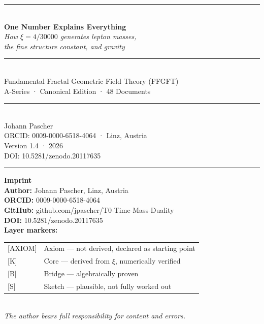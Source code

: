\documentclass[11pt,twoside,openright]{book}
\begin{document}
\begin{titlepage}
\centering
\vspace*{1.6cm}
{\color{t0blue}\rule{\textwidth}{2pt}}\\[1.2cm]
{\Huge\bfseries\color{t0blue} One Number Explains Everything}\\[0.7cm]
{\large\color{t0orange}\itshape
  How $\xi = 4/30000$ generates lepton masses,\\[0.2em]
  the fine structure constant, and gravity
}\\[1.1cm]
{\color{t0blue}\rule{0.55\textwidth}{0.8pt}}\\[1.0cm]
{\normalsize\color{black}
  Fundamental Fractal Geometric Field Theory (FFGFT)\\[0.2em]
  A-Series · Canonical Edition · 48 Documents
}\\[1.2cm]
{\color{t0blue}\rule{0.55\textwidth}{0.8pt}}\\[1.0cm]
{\large Johann Pascher}\\[0.3cm]
{\small ORCID: 0009-0000-6518-4064 · Linz, Austria}\\[0.2cm]
{\small Version 1.4 · 2026}\\[0.4cm]
{\small DOI: 10.5281/zenodo.20117635}\\[1.2cm]
{\color{t0blue}\rule{\textwidth}{2pt}}
\end{titlepage}

\thispagestyle{empty}
\vspace*{\fill}
{\small
\noindent\textbf{Imprint}\\[0.4em]
\textbf{Author:} Johann Pascher, Linz, Austria\\
\textbf{ORCID:} 0009-0000-6518-4064\\
\textbf{GitHub:} github.com/jpascher/T0-Time-Mass-Duality\\
\textbf{DOI:} 10.5281/zenodo.20117635\\[0.7em]
\textbf{Layer markers:}\\[0.3em]
\begin{tabular}{@{}ll@{}}
{[AXIOM]} & Axiom — not derived, declared as starting point \\[2pt]
{[K]} & Core — derived from $\xi$, numerically verified \\[2pt]
{[B]} & Bridge — algebraically proven \\[2pt]
{[S]} & Sketch — plausible, not fully worked out \\
\end{tabular}\\[0.7em]
\textit{The author bears full responsibility for content and errors.}
}
\clearpage
\end{document}
